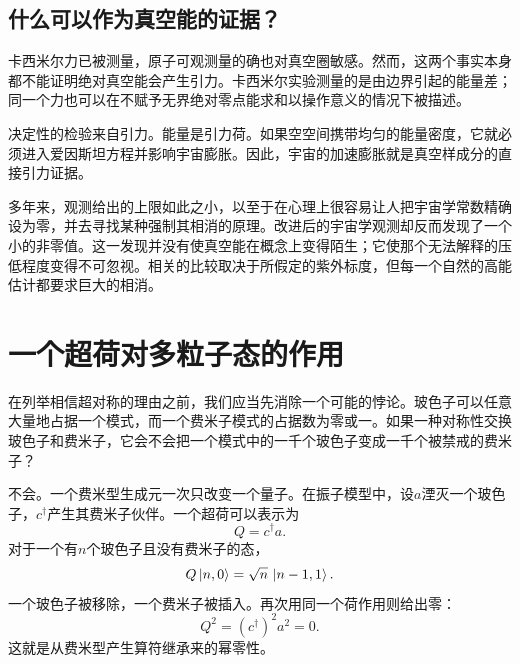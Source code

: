 \begin{classroomqa}
\end{classroomqa}

\subsection{什么可以作为真空能的证据？}

卡西米尔力已被测量，原子可观测量的确也对真空圈敏感。然而，这两个事实本身都不能证明绝对真空能会产生引力。卡西米尔实验测量的是由边界引起的能量差；同一个力也可以在不赋予无界绝对零点能求和以操作意义的情况下被描述。

决定性的检验来自引力。能量是引力荷。如果空空间携带均匀的能量密度，它就必须进入爱因斯坦方程并影响宇宙膨胀。因此，宇宙的加速膨胀就是真空样成分的直接引力证据。

\begin{classroomqa}
\end{classroomqa}

多年来，观测给出的上限如此之小，以至于在心理上很容易让人把宇宙学常数精确设为零，并去寻找某种强制其相消的原理。改进后的宇宙学观测却反而发现了一个小的非零值。这一发现并没有使真空能在概念上变得陌生；它使那个无法解释的压低程度变得不可忽视。相关的比较取决于所假定的紫外标度，但每一个自然的高能估计都要求巨大的相消。

\section{一个超荷对多粒子态的作用}

在列举相信超对称的理由之前，我们应当先消除一个可能的悖论。玻色子可以任意大量地占据一个模式，而一个费米子模式的占据数为零或一。如果一种对称性交换玻色子和费米子，它会不会把一个模式中的一千个玻色子变成一千个被禁戒的费米子？

不会。一个费米型生成元一次只改变一个量子。在振子模型中，设\(a\)湮灭一个玻色子，\(c^\dagger\)产生其费米子伙伴。一个超荷可以表示为
\begin{equation}
Q=c^\dagger a.
\end{equation}
对于一个有\(n\)个玻色子且没有费米子的态，
\begin{equation}
Q\left\lvert n,0\right\rangle
=\sqrt n\,\left\lvert n-1,1\right\rangle.
\end{equation}
一个玻色子被移除，一个费米子被插入。再次用同一个荷作用则给出零：
\begin{equation}
Q^2=(c^\dagger)^2a^2=0.
\end{equation}
这就是从费米型产生算符继承来的幂零性。

